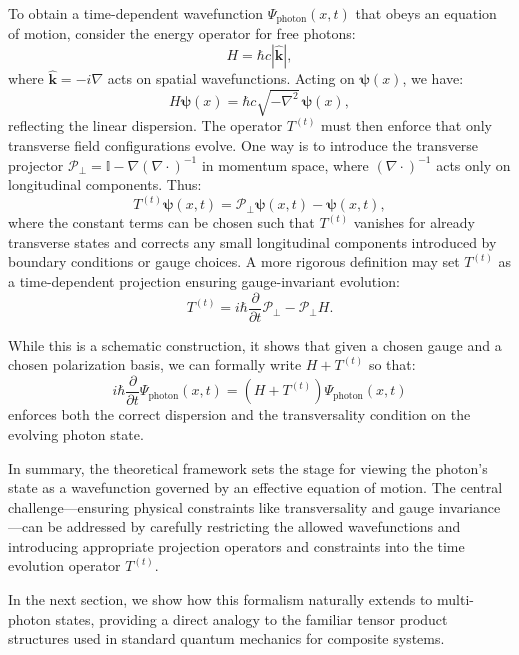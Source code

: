 \documentclass[aps,prl,twocolumn,showpacs,showkeys,superscriptaddress,amsmath,amssymb]{revtex4-2}
\begin{document}
To obtain a time-dependent wavefunction $\Psi_{\text{photon}}(x,t)$ that obeys an equation of motion, consider the energy operator for free photons:
\begin{equation}
H = \hbar c|\hat{\mathbf{k}}|,
\end{equation}
where $\hat{\mathbf{k}} = -i\nabla$ acts on spatial wavefunctions. Acting on $\bm{\psi}(x)$, we have:
\begin{equation}
H \bm{\psi}(x) = \hbar c\sqrt{-\nabla^2}\,\bm{\psi}(x),
\end{equation}
reflecting the linear dispersion. The operator $T^{(t)}$ must then enforce that only transverse field configurations evolve. One way is to introduce the transverse projector $\mathcal{P}_\perp = \mathbb{I} - \nabla(\nabla\cdot)^{-1}$ in momentum space, where $(\nabla\cdot)^{-1}$ acts only on longitudinal components. Thus:
\begin{equation}
T^{(t)}\bm{\psi}(x,t) = \mathcal{P}_\perp \bm{\psi}(x,t) - \bm{\psi}(x,t),
\end{equation}
where the constant terms can be chosen such that $T^{(t)}$ vanishes for already transverse states and corrects any small longitudinal components introduced by boundary conditions or gauge choices. A more rigorous definition may set $T^{(t)}$ as a time-dependent projection ensuring gauge-invariant evolution:
\begin{equation}
T^{(t)} = i\hbar\frac{\partial}{\partial t}\mathcal{P}_\perp - \mathcal{P}_\perp H.
\end{equation}

While this is a schematic construction, it shows that given a chosen gauge and a chosen polarization basis, we can formally write $H+T^{(t)}$ so that:
\begin{equation}
i\hbar\frac{\partial}{\partial t}\Psi_{\text{photon}}(x,t) = (H+T^{(t)})\Psi_{\text{photon}}(x,t)
\end{equation}
enforces both the correct dispersion and the transversality condition on the evolving photon state.

In summary, the theoretical framework sets the stage for viewing the photon’s state as a wavefunction governed by an effective equation of motion. The central challenge—ensuring physical constraints like transversality and gauge invariance—can be addressed by carefully restricting the allowed wavefunctions and introducing appropriate projection operators and constraints into the time evolution operator $T^{(t)}$.

In the next section, we show how this formalism naturally extends to multi-photon states, providing a direct analogy to the familiar tensor product structures used in standard quantum mechanics for composite systems.
\end{document}
